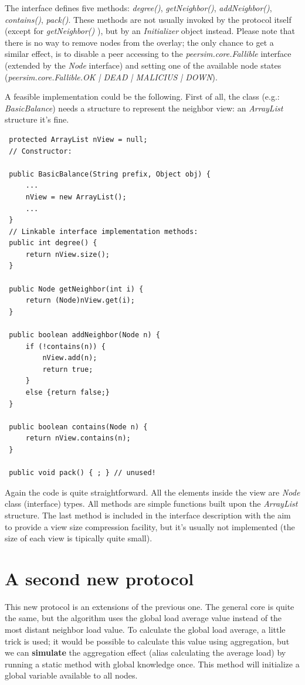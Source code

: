 \documentclass[a4paper,11pt]{article}
\begin{document}
The interface defines five methods: \emph{degree()}, \emph{getNeighbor()},
\emph{addNeighbor()}, \emph{contains()}, \emph{pack()}. These methods
are not usually invoked by the protocol itself (except for \emph{getNeighbor()}
), but by an \emph{Initializer} object instead. Please note that there
is no way to remove nodes from the overlay; the only chance to get
a similar effect, is to disable a peer accessing to the \emph{peersim.core.Fallible}
interface (extended by the \emph{Node} interface) and setting one
of the available node states (\emph{peersim.core.Fallible.OK | DEAD | 
MALICIUS | DOWN}). 

A feasible implementation could be the following. First of all, the
class (e.g.: \emph{BasicBalance}) needs a structure to represent the
neighbor view: an \emph{ArrayList} structure it's fine.\\

\footnotesize
\begin{verbatim}
 protected ArrayList nView = null;
 // Constructor:
 
 public BasicBalance(String prefix, Object obj) {
     ...
     nView = new ArrayList();
     ...
 }
 // Linkable interface implementation methods:
 public int degree() {
     return nView.size();
 }
 
 public Node getNeighbor(int i) {
     return (Node)nView.get(i);
 } 
 
 public boolean addNeighbor(Node n) {
     if (!contains(n)) {
         nView.add(n);
         return true;
     }
     else {return false;}
 }
 
 public boolean contains(Node n) {
     return nView.contains(n);
 }
 
 public void pack() { ; } // unused!
\end{verbatim}
\normalsize

Again the code is quite straightforward. All the elements inside the
view are \emph{Node} class (interface) types. All methods are simple
functions built upon the \emph{ArrayList} structure. The last method
is included in the interface description with the aim to provide a
view size compression facility, but it's usually not implemented (the
size of each view is tipically quite small).


\section{A second new protocol}

This new protocol is an extensions of the previous one. The general
core is quite the same, but the algorithm uses the global load average
value instead of the most distant neighbor load value. To calculate
the global load average, a little trick is used; it would be possible
to calculate this value using aggregation, but we can \textbf{simulate}
the aggregation effect (alias calculating the average load) by running
a static method with global knowledge once. This method will initialize
a global variable available to all nodes. 
\end{document}
